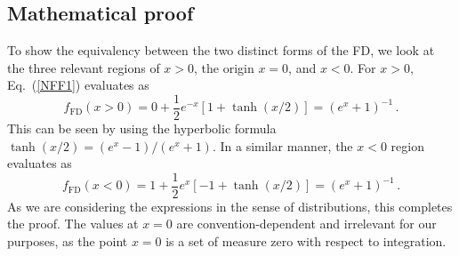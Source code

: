 \documentclass[sn-mathphys,Numbered]{sn-jnl}
\newcommand{\req}[1]{Eq.~(\ref{#1})}
\DeclareMathOperator{\sgn}{sgn}
\begin{document}
\subsection{Mathematical proof}
\label{Proof}
To show the equivalency between the two distinct forms of the FD, we look at the three relevant regions of $x>0$, the origin $x=0$, and $x<0$. For $x>0$, \req{NFF1} evaluates as
\begin{equation}\label{eq:xpos}
    f_\mathrm{FD}(x>0) = 0 + \frac{1}{2}e^{-x}[1+\tanh(x/2)] = (e^x + 1)^{-1}\,.
\end{equation}
This can be seen by using the hyperbolic formula $\tanh(x/2)=(e^x-1)/(e^x+1)$. In a similar manner, the $x<0$ region evaluates as
\begin{equation}\label{eq:xneg}
    f_\mathrm{FD}(x<0) = 1 + \frac{1}{2}e^{x}[-1 + \tanh(x/2)] = (e^x + 1)^{-1}\,.
\end{equation}
As we are considering the expressions in the sense of distributions, this completes the proof.  The values at $x=0$ are convention-dependent and irrelevant for our purposes, as the point $x=0$ is a set of measure zero with respect to integration.

\end{document}

